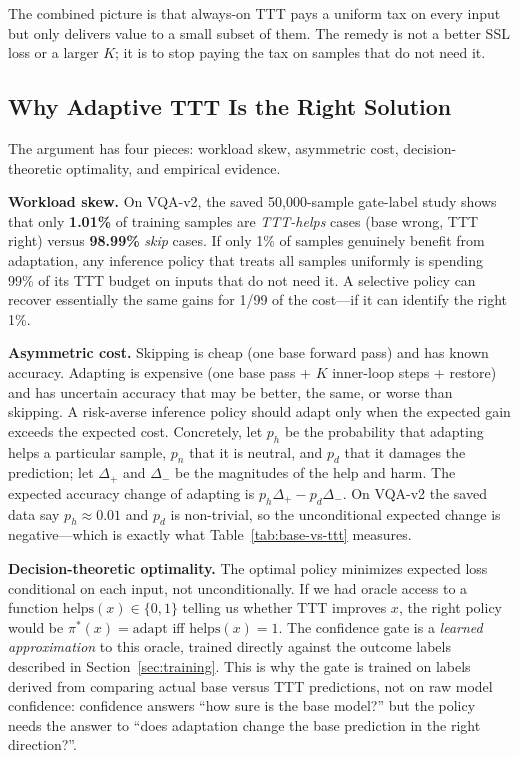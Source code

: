 \documentclass[conference]{IEEEtran}
\begin{document}
The combined picture is that always-on TTT pays a uniform tax on every
input but only delivers value to a small subset of them. The remedy is
not a better SSL loss or a larger $K$; it is to stop paying the tax on
samples that do not need it.

\subsection{Why Adaptive TTT Is the Right Solution}
\label{sec:why-adaptive}

The argument has four pieces: workload skew, asymmetric cost, decision-
theoretic optimality, and empirical evidence.

\textbf{Workload skew.} On VQA-v2, the saved 50{,}000-sample gate-label
study shows that only \textbf{1.01\%} of training samples are
\emph{TTT-helps} cases (base wrong, TTT right) versus \textbf{98.99\%}
\emph{skip} cases. If only 1\% of samples genuinely benefit from
adaptation, any inference policy that treats all samples uniformly is
spending 99\% of its TTT budget on inputs that do not need it. A
selective policy can recover essentially the same gains for 1/99 of the
cost---if it can identify the right 1\%.

\textbf{Asymmetric cost.} Skipping is cheap (one base forward pass) and
has known accuracy. Adapting is expensive (one base pass + $K$ inner-loop
steps + restore) and has uncertain accuracy that may be better, the
same, or worse than skipping. A risk-averse inference policy should
adapt only when the expected gain exceeds the expected cost. Concretely,
let $p_h$ be the probability that adapting helps a particular sample,
$p_n$ that it is neutral, and $p_d$ that it damages the prediction; let
$\Delta_+$ and $\Delta_-$ be the magnitudes of the help and harm. The
expected accuracy change of adapting is $p_h\Delta_+ - p_d\Delta_-$. On
VQA-v2 the saved data say $p_h \approx 0.01$ and $p_d$ is non-trivial,
so the unconditional expected change is negative---which is exactly
what Table~\ref{tab:base-vs-ttt} measures.

\textbf{Decision-theoretic optimality.} The optimal policy minimizes
expected loss conditional on each input, not unconditionally. If we had
oracle access to a function $\mathrm{helps}(x) \in \{0,1\}$ telling us
whether TTT improves $x$, the right policy would be $\pi^*(x) =
\mathrm{adapt}$ iff $\mathrm{helps}(x) = 1$. The confidence gate is a
\emph{learned approximation} to this oracle, trained directly against
the outcome labels described in Section~\ref{sec:training}. This is why
the gate is trained on labels derived from comparing actual base versus
TTT predictions, not on raw model confidence: confidence answers ``how
sure is the base model?'' but the policy needs the answer to ``does
adaptation change the base prediction in the right direction?''.
\end{document}
